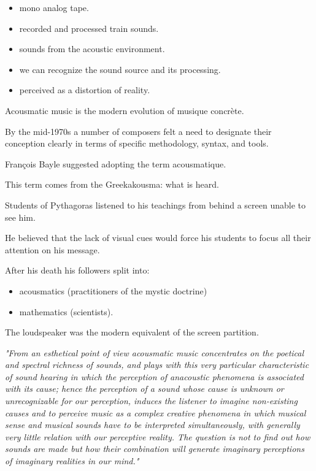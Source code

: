 \begin{itemize}
\tightlist
\item mono analog tape.
\item recorded and processed train sounds.
\item sounds from the acoustic environment.
\item we can recognize the sound source and its processing.
\item perceived as a distortion of reality.
\end{itemize}

Acousmatic music is the modern evolution of musique concrète.

By the mid-1970s a number of composers felt a need to designate their conception clearly in terms of specific methodology, syntax, and tools.

François Bayle suggested adopting the term acousmatique.

This term comes from the Greekakousma: what is heard.

Students of Pythagoras listened to his teachings from behind a screen unable to see him.

He believed that the lack of visual cues would force his students to focus all their attention on his message.

After his death his followers split into:

\begin{itemize}
\tightlist
\item acousmatics (practitioners of the mystic doctrine)
\item mathematics (scientists).
\end{itemize}

The loudspeaker was the modern equivalent of the screen partition.

\textit{"From an esthetical point of view acousmatic music concentrates on the poetical and spectral richness of sounds, and plays with this very particular characteristic of sound hearing in which the perception of anacoustic phenomena is associated with its cause; hence the perception of a sound whose cause is unknown or unrecognizable for our perception, induces the listener to imagine non-existing causes and to perceive
music as a complex creative phenomena in which musical sense and musical sounds have to be interpreted simultaneously, with generally very little relation with our perceptive reality. The question is not to find out how sounds are made but how their combination will generate imaginary perceptions of imaginary realities in our mind."}

